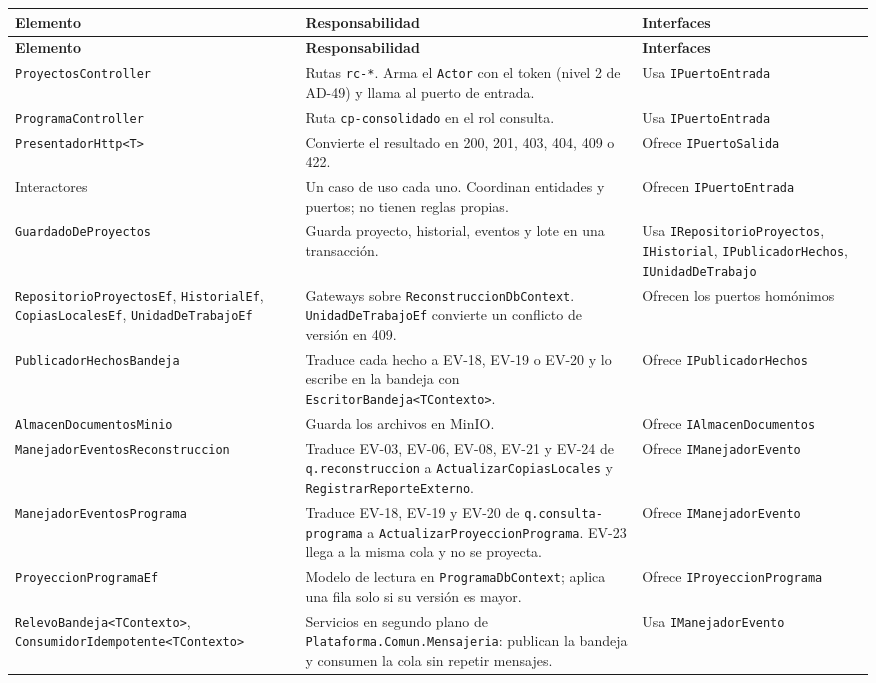 \documentclass[11pt,a4paper]{article}
\begin{document}
{\small
\begin{longtable}{|P{4.2cm}|P{6.4cm}|P{4.0cm}|}
  \hline
  \textbf{Elemento} & \textbf{Responsabilidad} & \textbf{Interfaces} \\ \hline
  \endfirsthead
  \hline
  \textbf{Elemento} & \textbf{Responsabilidad} & \textbf{Interfaces} \\ \hline
  \endhead
  \texttt{ProyectosController} & Rutas \texttt{rc-*}. Arma el \texttt{Actor} con el token (nivel 2 de AD-49) y
    llama al puerto de entrada. & Usa \texttt{IPuertoEntrada} \\ \hline
  \texttt{ProgramaController} & Ruta \texttt{cp-consolidado} en el rol consulta. & Usa \texttt{IPuertoEntrada} \\
    \hline
  \texttt{PresentadorHttp<T>} & Convierte el resultado en 200, 201, 403, 404, 409 o 422. & Ofrece
    \texttt{IPuertoSalida} \\ \hline
  Interactores & Un caso de uso cada uno. Coordinan entidades y puertos; no tienen reglas propias. & Ofrecen
    \texttt{IPuertoEntrada} \\ \hline
  \texttt{GuardadoDeProyectos} & Guarda proyecto, historial, eventos y lote en una transacción. & Usa
    \texttt{IRepositorioProyectos}, \texttt{IHistorial}, \texttt{IPublicadorHechos}, \texttt{IUnidadDeTrabajo} \\
    \hline
  \texttt{RepositorioProyectosEf}, \texttt{HistorialEf}, \texttt{CopiasLocalesEf}, \texttt{UnidadDeTrabajoEf} &
    Gateways sobre \texttt{ReconstruccionDbContext}. \texttt{UnidadDeTrabajoEf} convierte un conflicto de versión
    en 409. & Ofrecen los puertos homónimos \\ \hline
  \texttt{PublicadorHechosBandeja} & Traduce cada hecho a EV-18, EV-19 o EV-20 y lo escribe en la bandeja con
    \texttt{EscritorBandeja<TContexto>}. & Ofrece \texttt{IPublicadorHechos} \\ \hline
  \texttt{AlmacenDocumentosMinio} & Guarda los archivos en MinIO. & Ofrece \texttt{IAlmacenDocumentos} \\ \hline
  \texttt{ManejadorEventos\allowbreak Reconstruccion} & Traduce EV-03, EV-06, EV-08, EV-21 y EV-24 de
    \texttt{q.reconstruccion} a \texttt{ActualizarCopiasLocales} y \texttt{RegistrarReporteExterno}. & Ofrece
    \texttt{IManejadorEvento} \\ \hline
  \texttt{ManejadorEventos\allowbreak Programa} & Traduce EV-18, EV-19 y EV-20 de \texttt{q.consulta-programa} a
    \texttt{ActualizarProyeccionPrograma}. EV-23 llega a la misma cola y no se proyecta. & Ofrece
    \texttt{IManejadorEvento} \\ \hline
  \texttt{ProyeccionProgramaEf} & Modelo de lectura en \texttt{ProgramaDbContext}; aplica una fila solo si su versión
    es mayor. & Ofrece \texttt{IProyeccionPrograma} \\ \hline
  \texttt{RelevoBandeja\allowbreak <TContexto>}, \texttt{Consumidor\allowbreak Idempotente\allowbreak <TContexto>} & Servicios en segundo plano de
    \texttt{Plataforma.Comun.Mensajeria}: publican la bandeja y consumen la cola sin repetir mensajes. & Usa
    \texttt{IManejadorEvento} \\ \hline
\end{longtable}
}
\end{document}
